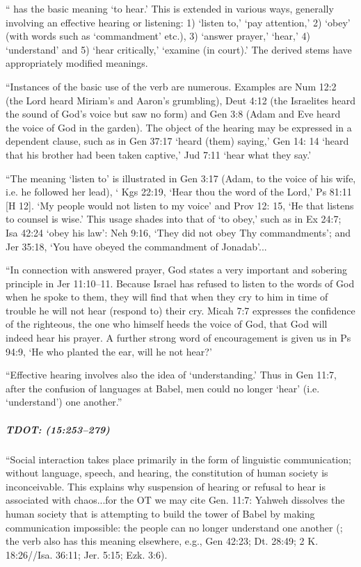 				`` has the basic meaning `to hear.' This is extended in various ways, generally involving an effective hearing or listening: 1) `listen to,' `pay attention,' 2) `obey' (with words such as `commandment' etc.), 3) `answer prayer,' `hear,' 4) `understand' and 5) `hear critically,' `examine (in court).' The derived stems have appropriately modified meanings.
				
				``Instances of the basic use of the verb are numerous. Examples are Num 12:2 (the Lord heard Miriam's and Aaron's grumbling), Deut 4:12 (the Israelites heard the sound of God's voice but saw no form) and Gen 3:8 (Adam and Eve heard the voice of God in the garden). The object of the hearing may be expressed in a dependent clause, such as in Gen 37:17 `heard (them) saying,' Gen 14: 14 `heard that his brother had been taken captive,' Jud 7:11 `hear what they say.'
				
				``The meaning `listen to' is illustrated in Gen 3:17 (Adam, to the voice of his wife, i.e. he followed her lead), ` Kgs 22:19, `Hear thou the word of the Lord,' Ps 81:11 [H 12]. `My people would not listen to my voice' and Prov 12: 15, `He that listens to counsel is wise.' This usage shades into that of `to obey,' such as in Ex 24:7; Isa 42:24 `obey his law': Neh 9:16, `They did not obey Thy commandments'; and Jer 35:18, `You have obeyed the commandment of Jonadab'...
				
				``In connection with answered prayer, God states a very important and sobering principle in Jer 11:10--11. Because Israel has refused to listen to the words of God when he spoke to them, they will find that when they cry to him in time of trouble he will not hear (respond to) their cry. Micah 7:7 expresses the confidence of the righteous, the one who himself heeds the voice of God, that God will indeed hear his prayer. A further strong word of encouragement is given us in Ps 94:9, `He who planted the ear, will he not hear?'
				
				``Effective hearing involves also the idea of `understanding.' Thus in Gen 11:7, after the confusion of languages at Babel, men could no longer `hear' (i.e. `understand') one another.''
				
			\subparagraph{TDOT: \texorpdfstring{}{} (15:253--279)}
				\label{SHAMA-TDOT}
				
				``Social interaction takes place primarily in the form of linguistic communication; without language, speech, and hearing, the constitution of human society is inconceivable. This explains why suspension of hearing or refusal to hear is associated with chaos...for the OT we may cite Gen. 11:7: Yahweh dissolves the human society that is attempting to build the tower of Babel by making communication impossible: the people can no longer understand one another (; the verb also has this meaning elsewhere, e.g., Gen 42:23; Dt. 28:49; 2 K. 18:26//Isa. 36:11; Jer. 5:15; Ezk. 3:6).
				
